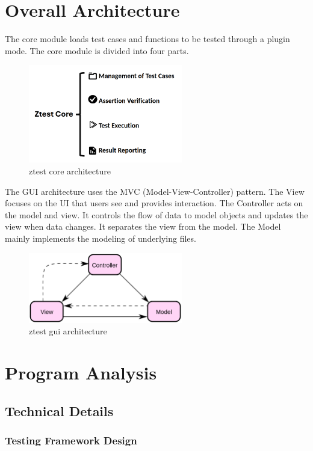 \documentclass[english]{article}
\begin{document}
\section{Overall Architecture}
The core module loads test cases and functions to be tested through a plugin mode. The core module is divided into four parts.
\begin{figure}[H]
    \centering
    \includegraphics[width=0.6\textwidth]{img/ztest.png} %
    \caption{ ztest core architecture}
    \label{fig:ztest core architecture}
\end{figure}

The GUI architecture uses the MVC (Model-View-Controller) pattern. The View focuses on the UI that users see and provides interaction. The Controller acts on the model and view. It controls the flow of data to model objects and updates the view when data changes. It separates the view from the model. The Model mainly implements the modeling of underlying files.
\begin{figure}[H]
    \centering
    \includegraphics[width=0.6\textwidth]{img/mvc.png} %
    \caption{ ztest gui architecture}
    \label{fig:mvc}
\end{figure}
\section{Program Analysis}

\subsection{Technical Details}
\subsubsection{Testing Framework Design}
\end{document}
